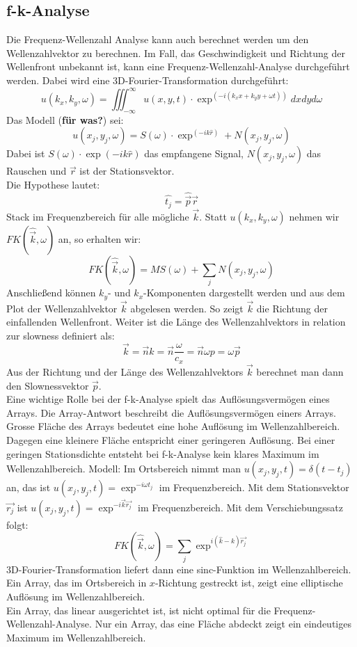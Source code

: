 \subsection{f-k-Analyse}
Die Frequenz-Wellenzahl Analyse kann auch berechnet werden um den Wellenzahlvektor zu berechnen.
Im Fall, das Geschwindigkeit und Richtung der Wellenfront unbekannt ist, kann eine Frequenz-Wellenzahl-Analyse durchgeführt werden. Dabei wird eine 3D-Fourier-Transformation durchgeführt:
\begin{equation}
u(k_{x},k_{y},\omega) = \iiint_{-\infty}^{\infty} u(x,y,t)\cdot\exp^{(-i(k_{x}x+k_{y}y+\omega t))} dxdyd\omega
\end{equation}
Das Modell (\textbf{für was?}) sei:
\[
u(x_{j},y_{j},\omega) = S(\omega)\cdot\exp^{(-ik\hat{r})}+N(x_{j},y_{j},\omega)
\]
{\small Dabei ist $S(\omega)\cdot\exp({-ik\hat{r}})$ das empfangene Signal, $N(x_{j},y_{j},\omega)$ das Rauschen und $\vec{r}$ ist der Stationsvektor.}\\
Die Hypothese lautet:
\[
\hat{t_{j}} = \hat{\vec{p}} \vec{r}
\]
Stack im Frequenzbereich für alle mögliche $\vec{k}$.
Statt $u(k_{x}, k_{y}, \omega)$ nehmen wir $FK(\hat{\vec{k}},\omega)$ an, so erhalten wir:
\begin{equation}
FK(\hat{\vec{k}},\omega) = M S(\omega)+\sum_{j}N(x_{j},y_{j},\omega)
\end{equation}
Anschließend können $k_{y}$- und $k_{x}$-Komponenten dargestellt werden und aus dem Plot der Wellenzahlvektor $\vec{k}$ abgelesen werden. So zeigt $\vec{k}$ die Richtung der einfallenden Wellenfront.
Weiter ist die Länge des Wellenzahlvektors in relation zur slowness definiert als:
\begin{equation}
\vec{k} = \vec{n} k = \vec{n} \dfrac{\omega}{c_x} = \vec{n} \omega p= \omega \vec{p} 
\end{equation}
Aus der Richtung und der Länge des Wellenzahlvektors $\vec{k}$ berechnet man dann den Slownessvektor $\vec{p}$.\\
Eine wichtige Rolle bei der f-k-Analyse spielt das Auflösungsvermögen eines Arrays. Die Array-Antwort beschreibt die Auflösungsvermögen einers Arrays. Grosse Fläche des Arrays bedeutet eine hohe Auflösung im Wellenzahlbereich. Dagegen eine kleinere Fläche entspricht einer geringeren Auflösung. Bei einer geringen Stationsdichte entsteht bei f-k-Analyse kein klares Maximum im Wellenzahlbereich.
Modell: Im Ortsbereich nimmt man $u(x_{j},y_{j},t) = \delta(t-t_{j})$ an, das ist $u(x_{j},y_{j},t)= \exp^{-i\omega t_{j}}$ im Frequenzbereich. Mit dem Stationsvektor $\vec{r_{j}}$ ist $u(x_{j},y_{j},t) = \exp^{-i\vec{k}\vec{r_{j}}}$  im Frequenzbereich.
Mit dem Verschiebungssatz folgt:
\begin{equation}
FK(\hat{\vec{k}},\omega) = \sum_{j}\exp^{i( \hat{k}-k)\vec{r_{j}}}
\end{equation}
3D-Fourier-Transformation liefert dann eine sinc-Funktion im Wellenzahlbereich. Ein Array, das im Ortsbereich  in $x$-Richtung gestreckt ist, zeigt eine elliptische Auflösung im Wellenzahlbereich.\\
Ein Array, das linear ausgerichtet ist, ist nicht optimal für die Frequenz-Wellenzahl-Analyse. Nur ein Array, das eine Fläche abdeckt zeigt ein eindeutiges Maximum im Wellenzahlbereich.